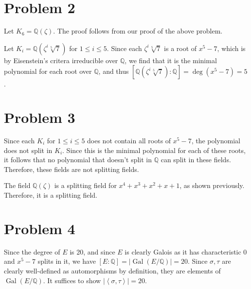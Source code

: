 \documentclass[11pt, letterpaper]{article}
\begin{document}
\section*{Problem 2}
Let $K_6=\mathbb{Q} (\zeta )$. The proof follows from our proof of the above problem.

Let $K_i=\mathbb{Q} (\zeta^{i}\sqrt[5]{7} )$ for $1\leq i\leq 5$. Since each $\zeta ^i \sqrt[5]{7} $ is a root of $x^5-7$, which is by Eisenstein's critera irreducible over $\mathbb{Q} $, we find that it is the minimal polynomial for each root over $\mathbb{Q} $, and thus $\left[ \mathbb{Q} (\zeta ^i \sqrt[5]{7} ):\mathbb{Q}  \right] =\operatorname{deg} \left( x^5-7 \right) =5$.
\section*{Problem 3}
Since each $K_i$ for $1\leq i\leq 5$ does not contain all roots of $x^5-7$, the polynomial does not split in $K_i$. Since this is the minimal polynomial for each of these roots, it follows that no polynomial that doesn't split in $\mathbb{Q} $ can split in these fields. Therefore, these fields are not splitting fields.

The field $\mathbb{Q} (\zeta )$ is a splitting field for $x^4+x^3+x^2+x+1$, as shown previously. Therefore, it is a splitting field.
\section*{Problem 4}
Since the degree of $E$ is 20, and since $E$ is clearly Galois as it has characteristic 0 and $x^5-7$ splits in it, we have $\left[ E:\mathbb{Q}  \right] =\left| \operatorname{Gal} (E/\mathbb{Q} ) \right| =20$. Since $\sigma ,\tau $ are clearly well-defined as automorphisms by definition, they are elements of $\operatorname{Gal} (E/\mathbb{Q} )$. It suffices to show $|\left\langle \sigma ,\tau  \right\rangle| =20$.
\end{document}
